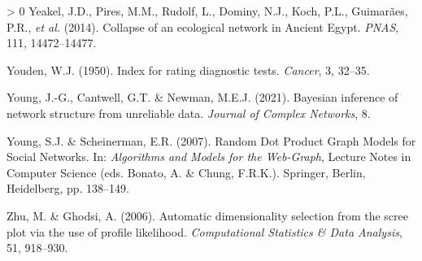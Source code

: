 \documentclass[11pt]{article}
\newlength{\cslhangindent}
\newenvironment{CSLReferences}[3] %
 {%
  \setlength{\parindent}{0pt}
  \ifodd #1 \everypar{\setlength{\hangindent}{\cslhangindent}}\ignorespaces\fi
  \ifnum #2 > 0
  \setlength{\parskip}{#2\baselineskip}
  \fi
 }%
 {}
\begin{document}
\begin{CSLReferences}{1}{0}
\leavevmode\hypertarget{ref-Yeakel2014ColEco}{}%
Yeakel, J.D., Pires, M.M., Rudolf, L., Dominy, N.J., Koch, P.L.,
Guimarães, P.R., \emph{et al.} (2014). Collapse of an ecological network
in Ancient Egypt. \emph{PNAS}, 111, 14472--14477.

\leavevmode\hypertarget{ref-Youden1950IndRat}{}%
Youden, W.J. (1950). Index for rating diagnostic tests. \emph{Cancer},
3, 32--35.

\leavevmode\hypertarget{ref-Young2021BayInf}{}%
Young, J.-G., Cantwell, G.T. \& Newman, M.E.J. (2021). Bayesian
inference of network structure from unreliable data. \emph{Journal of
Complex Networks}, 8.

\leavevmode\hypertarget{ref-Young2007RanDot}{}%
Young, S.J. \& Scheinerman, E.R. (2007). Random Dot Product Graph Models
for Social Networks. In: \emph{Algorithms and Models for the Web-Graph},
Lecture Notes in Computer Science (eds. Bonato, A. \& Chung, F.R.K.).
Springer, Berlin, Heidelberg, pp. 138--149.

\leavevmode\hypertarget{ref-Zhu2006AutDim}{}%
Zhu, M. \& Ghodsi, A. (2006). Automatic dimensionality selection from
the scree plot via the use of profile likelihood. \emph{Computational
Statistics \& Data Analysis}, 51, 918--930.

\end{CSLReferences}
\end{document}
